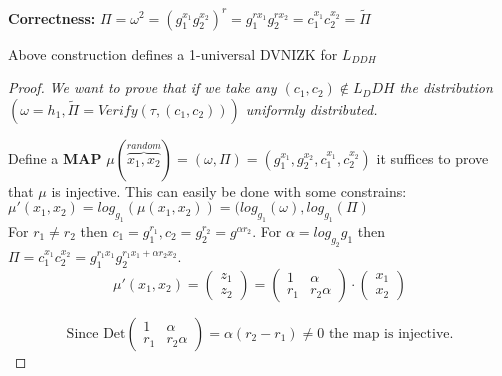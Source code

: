 \textbf{Correctness:} $\Pi=\omega^2=(g_1^{x_1}g_2^{x_2})^r=g_1^{rx_1}g_2^{rx_2}=c_1^{x_1}c_2^{x_2}=\widetilde{\Pi}$

\begin{theorem}
    Above construction defines a 1-universal DVNIZK for $L_{DDH}$
\end{theorem}

\begin{proof}

    \textit{We want to prove that if we take any $(c_1,c_2)\notin L_DDH$ the distribution $(\omega=h_1, \widetilde{\Pi}=Verify(\tau,(c_1,c_2)))$ uniformly distributed.}

    Define a \textbf{MAP} $\mu(\overbrace{x_1,x_2}^{random})=(\omega,\Pi)=(g_1^{x_1},g_2^{x_2},c_1^{x_1},c_2^{x_2})$ it suffices to prove that $\mu$ is injective. This can easily be done with some constrains:
    $\mu'(x_1,x_2)=log_{g_1}(\mu(x_1,x_2))=(log_{g_1}(\omega),log_{g_1}(\Pi)$\\
    For $r_1\neq r_2$ then $c_1=g_1^{r_1},c_2=g_2^{r_2}=g^{\alpha r_2}$. For $\alpha=log_{g_2}g_1$ then $\Pi=c_1^{x_1}c_2^{x_2}=g_1^{r_1x_1}g_2^{r_1x_1+\alpha r_2x_2}$.\\
    \[\mu'(x_1,x_2)=
        \begin{pmatrix}
            z_1\\
            z_2
        \end{pmatrix}
        =
        \begin{pmatrix}
            1 & \alpha \\
            r_1 & r_2\alpha 
        \end{pmatrix}
        \cdot
        \begin{pmatrix}
            x_1\\
            x_2
        \end{pmatrix}
    \]

    \[ \text{Since Det}
    \begin{pmatrix}
        1 & \alpha \\
        r_1 & r_2\alpha 
    \end{pmatrix}=
    \alpha(r_2-r_1)\neq 0
    \text{ the map is injective.}
    \] 

\end{proof}


